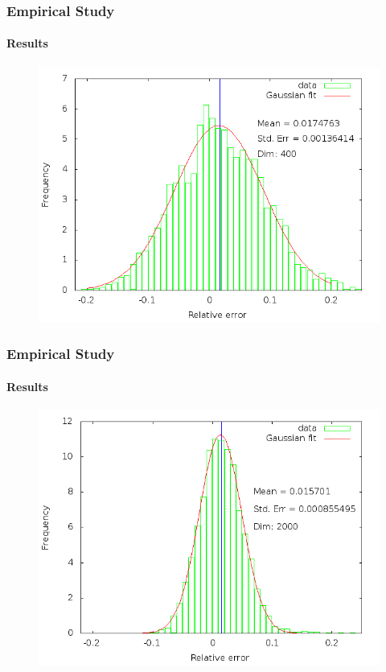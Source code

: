 \documentclass{beamer}
\begin{document}
\begin{frame}
\frametitle{Empirical Study}
\framesubtitle{Results}
  		\begin{figure}
		\includegraphics[scale=0.46]{histogram400.png}
	\end{figure}
\end{frame}

\begin{frame}
\frametitle{Empirical Study}
\framesubtitle{Results}
  		\begin{figure}
		\includegraphics[scale=0.46]{histogram2000.png}
	\end{figure}
\end{frame}
\end{document}
